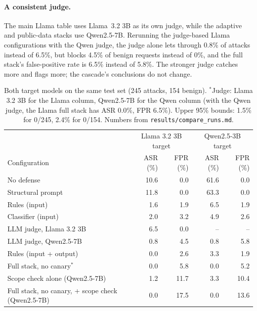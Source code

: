 \documentclass[11pt]{article}
\begin{document}
\paragraph{A consistent judge.} The main Llama table uses Llama~3.2 3B as its own judge, while the adaptive and public-data stacks use
Qwen2.5-7B. Rerunning the judge-based Llama configurations with the Qwen judge, the judge alone lets through 0.8\% of attacks instead of 6.5\%,
but blocks 4.5\% of benign requests instead of 0\%, and the full stack's false-positive rate is 6.5\% instead of 5.8\%. The stronger judge
catches more and flags more; the cascade's conclusions do not change.
\begin{table}[t]
\centering\small
\begin{tabular}{@{}lrrrr@{}}
\toprule
& \multicolumn{2}{c}{Llama 3.2 3B target} & \multicolumn{2}{c}{Qwen2.5-3B target} \\
Configuration & ASR (\%) & FPR (\%) & ASR (\%) & FPR (\%) \\
\midrule
No defense & 10.6 & 0.0 & 61.6 & 0.0 \\
Structural prompt & 11.8 & 0.0 & 63.3 & 0.0 \\
Rules (input) & 1.6 & 1.9 & 6.5 & 1.9 \\
Classifier (input) & 2.0 & 3.2 & 4.9 & 2.6 \\
LLM judge, Llama 3.2 3B & 6.5 & 0.0 & -- & -- \\
LLM judge, Qwen2.5-7B & 0.8 & 4.5 & 0.8 & 5.8 \\
Rules (input + output) & 0.0 & 2.6 & 3.3 & 1.9 \\
Full stack, no canary$^\ast$ & 0.0 & 5.8 & 0.0 & 5.2 \\
Scope check alone (Qwen2.5-7B) & 1.2 & 11.7 & 3.3 & 10.4 \\
Full stack, no canary, + scope check (Qwen2.5-7B) & 0.0 & 17.5 & 0.0 & 13.6 \\
\bottomrule
\end{tabular}
\caption{Both target models on the same test set (245 attacks, 154 benign). $^\ast$Judge: Llama 3.2 3B for the Llama column, Qwen2.5-7B for the
Qwen column (with the Qwen judge, the Llama full stack has ASR 0.0\%, FPR 6.5\%). Upper 95\% bounds: 1.5\% for 0/245, 2.4\% for 0/154.
Numbers from \texttt{results/\allowbreak compare\_runs.md}.}\label{tab:models}
\end{table}
\end{document}

